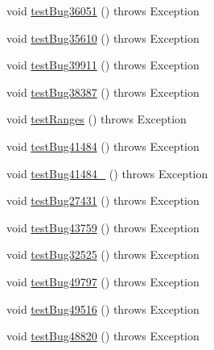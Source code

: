 \begin{DoxyCompactItemize}
\item 
void \mbox{\hyperlink{classtestsuite_1_1regression_1_1_result_set_regression_test_aabff0fcb9864462c3e2572817774d404}{test\+Bug36051}} ()  throws Exception 
\item 
void \mbox{\hyperlink{classtestsuite_1_1regression_1_1_result_set_regression_test_a8542bd8a4dd0127b113219d416c5be53}{test\+Bug35610}} ()  throws Exception 
\item 
void \mbox{\hyperlink{classtestsuite_1_1regression_1_1_result_set_regression_test_ac36269358f8d90ebeebaf8a8434ba03a}{test\+Bug39911}} ()  throws Exception 
\item 
void \mbox{\hyperlink{classtestsuite_1_1regression_1_1_result_set_regression_test_a1df33cf7811c403c00266a8a9c057fc4}{test\+Bug38387}} ()  throws Exception 
\item 
void \mbox{\hyperlink{classtestsuite_1_1regression_1_1_result_set_regression_test_a24f4f617564da00fd33b14570d169cbd}{test\+Ranges}} ()  throws Exception 
\item 
void \mbox{\hyperlink{classtestsuite_1_1regression_1_1_result_set_regression_test_a80a9d333e89511f5233ebc8c8d2fd4b6}{test\+Bug41484}} ()  throws Exception 
\item 
void \mbox{\hyperlink{classtestsuite_1_1regression_1_1_result_set_regression_test_a277270b4a0b99c710f7040c4060f3509}{test\+Bug41484\+\_}} ()  throws Exception 
\item 
void \mbox{\hyperlink{classtestsuite_1_1regression_1_1_result_set_regression_test_a15f6161acd08c5aa030af74045acd6c8}{test\+Bug27431}} ()  throws Exception 
\item 
void \mbox{\hyperlink{classtestsuite_1_1regression_1_1_result_set_regression_test_af72a1e07910322da0f010345b453ad30}{test\+Bug43759}} ()  throws Exception 
\item 
void \mbox{\hyperlink{classtestsuite_1_1regression_1_1_result_set_regression_test_a2d05815bd32afdc952e88b17670fcaa1}{test\+Bug32525}} ()  throws Exception 
\item 
void \mbox{\hyperlink{classtestsuite_1_1regression_1_1_result_set_regression_test_a58151b0b150fc2903bb39f7a4f2ba9be}{test\+Bug49797}} ()  throws Exception 
\item 
void \mbox{\hyperlink{classtestsuite_1_1regression_1_1_result_set_regression_test_a88928c884a03c36c24fab5012551fb34}{test\+Bug49516}} ()  throws Exception 
\item 
void \mbox{\hyperlink{classtestsuite_1_1regression_1_1_result_set_regression_test_a5c528e2d33add6967d896cad89b97c8d}{test\+Bug48820}} ()  throws Exception 

\end{DoxyCompactItemize}

